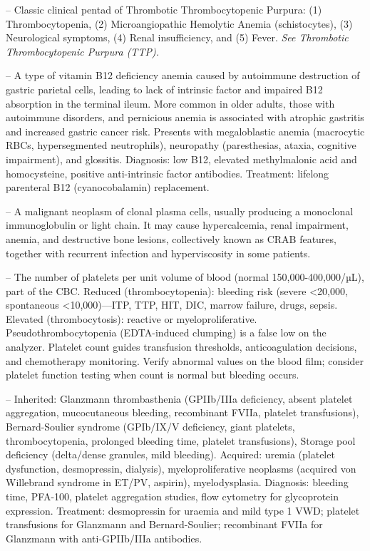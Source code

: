 -- Classic clinical pentad of Thrombotic Thrombocytopenic Purpura: (1) Thrombocytopenia, (2) Microangiopathic Hemolytic Anemia (schistocytes), (3) Neurological symptoms, (4) Renal insufficiency, and (5) Fever. \textit{See Thrombotic Thrombocytopenic Purpura (TTP).}

-- A type of vitamin B12 deficiency anemia caused by autoimmune destruction of gastric parietal cells, leading to lack of intrinsic factor and impaired B12 absorption in the terminal ileum. More common in older adults, those with autoimmune disorders, and pernicious anemia is associated with atrophic gastritis and increased gastric cancer risk. Presents with megaloblastic anemia (macrocytic RBCs, hypersegmented neutrophils), neuropathy (paresthesias, ataxia, cognitive impairment), and glossitis. Diagnosis: low B12, elevated methylmalonic acid and homocysteine, positive anti-intrinsic factor antibodies. Treatment: lifelong parenteral B12 (cyanocobalamin) replacement.

-- A malignant neoplasm of clonal plasma cells, usually producing a monoclonal immunoglobulin or light chain. It may cause hypercalcemia, renal impairment, anemia, and destructive bone lesions, collectively known as CRAB features, together with recurrent infection and hyperviscosity in some patients.

-- The number of platelets per unit volume of blood (normal 150,000-400,000/µL), part of the CBC. Reduced (thrombocytopenia): bleeding risk (severe <20,000, spontaneous <10,000)—ITP, TTP, HIT, DIC, marrow failure, drugs, sepsis. Elevated (thrombocytosis): reactive or myeloproliferative. Pseudothrombocytopenia (EDTA-induced clumping) is a false low on the analyzer. Platelet count guides transfusion thresholds, anticoagulation decisions, and chemotherapy monitoring. Verify abnormal values on the blood film; consider platelet function testing when count is normal but bleeding occurs.

-- Inherited: Glanzmann thrombasthenia (GPIIb/IIIa deficiency, absent platelet aggregation, mucocutaneous bleeding, recombinant FVIIa, platelet transfusions), Bernard-Soulier syndrome (GPIb/IX/V deficiency, giant platelets, thrombocytopenia, prolonged bleeding time, platelet transfusions), Storage pool deficiency (delta/dense granules, mild bleeding). Acquired: uremia (platelet dysfunction, desmopressin, dialysis), myeloproliferative neoplasms (acquired von Willebrand syndrome in ET/PV, aspirin), myelodysplasia. Diagnosis: bleeding time, PFA-100, platelet aggregation studies, flow cytometry for glycoprotein expression. Treatment: desmopressin for uraemia and mild type 1 VWD; platelet transfusions for Glanzmann and Bernard-Soulier; recombinant FVIIa for Glanzmann with anti-GPIIb/IIIa antibodies.


